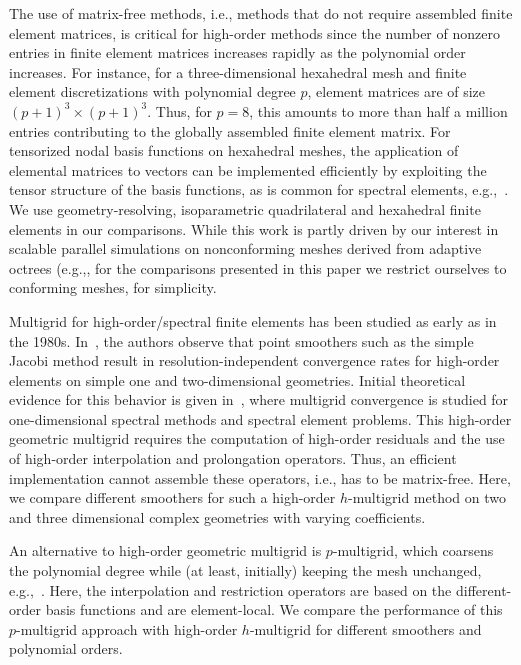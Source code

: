 \documentclass[smallcondensed,final]{svjour3}     %
\begin{document}
The use of matrix-free methods, i.e., methods that do not require assembled finite element matrices, is critical for high-order methods since the number of nonzero entries in
finite element matrices increases rapidly as the polynomial order increases.
For instance, for a three-dimensional hexahedral mesh and finite element
discretizations with polynomial degree $p$, element matrices are of size
$(p+1)^3\times (p+1)^3$. Thus, for $p=8$, this amounts to more than
half a million entries contributing to the globally assembled finite element
matrix.  For tensorized nodal basis functions on hexahedral meshes, the
application of elemental matrices to vectors can be implemented efficiently by
exploiting the tensor structure of the basis functions, as is common for
spectral elements, e.g.,~\cite{DevilleFischerMund02}. We use
geometry-resolving, isoparametric quadrilateral and hexahedral finite elements
in our comparisons. While this work is partly driven by our interest in
scalable parallel simulations on nonconforming meshes derived from adaptive
octrees (e.g.,\cite{SundarBirosBursteddeEtAl12, SampathBiros10,
BursteddeGhattasGurnisEtAl10}, for the comparisons presented in this paper we
restrict ourselves to conforming meshes, for simplicity.



Multigrid for high-order/spectral finite elements has been studied as early as
in the 1980s. In~\cite{RonquistPatera87}, the authors observe that point
smoothers such as the simple Jacobi method result in resolution-independent
convergence rates for high-order elements on simple one and two-dimensional
geometries. Initial theoretical evidence for this behavior is given
in~\cite{MadayMunoz88}, where multigrid convergence is studied for
one-dimensional spectral methods and spectral element problems. This high-order
geometric multigrid requires the computation of high-order residuals and the use of
high-order interpolation and prolongation operators. Thus, an efficient implementation
cannot assemble these operators, i.e., has to be matrix-free.  Here, we compare
different smoothers for such a high-order $h$-multigrid method on two and three
dimensional complex geometries with varying coefficients.

An alternative to high-order geometric multigrid is $p$-multigrid, which
coarsens the polynomial degree while (at least, initially) keeping the mesh
unchanged, e.g.,~\cite{HelenbrookMavriplisAtkins03}. Here, the interpolation and restriction operators are based on the different-order basis functions and are element-local.  We compare the
performance of this $p$-multigrid approach
with high-order $h$-multigrid for different smoothers and polynomial orders.
\end{document}
